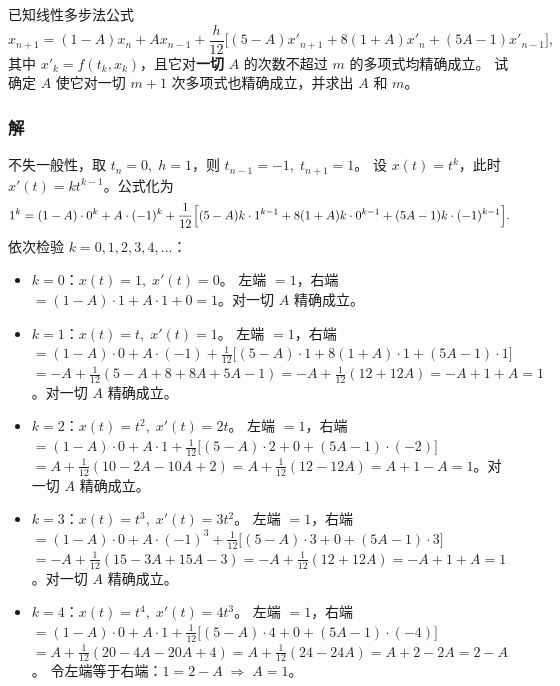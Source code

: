 \documentclass{article}
\begin{document}
已知线性多步法公式
\[
x_{n+1} = (1 - A)x_n + A x_{n-1} 
+ \frac{h}{12}\bigl[(5 - A)x'_{n+1} + 8(1 + A)x'_n + (5A - 1)x'_{n-1}\bigr],
\]
其中 $x'_k = f(t_k, x_k)$，且它对\textbf{一切} $A$ 的次数不超过 $m$ 的多项式均精确成立。
试确定 $A$ 使它对一切 $m+1$ 次多项式也精确成立，并求出 $A$ 和 $m$。

\subsubsection*{解}
不失一般性，取 $t_n = 0, \; h = 1$，则 $t_{n-1} = -1,\; t_{n+1} = 1$。
设 $x(t) = t^k$，此时 $x'(t) = k t^{k-1}$。公式化为
\[
1^k = (1 - A) \cdot 0^k + A \cdot (-1)^k 
+ \frac{1}{12}\Bigl[ (5 - A) k \cdot 1^{k-1} + 8(1 + A) k \cdot 0^{k-1} 
+ (5A - 1) k \cdot (-1)^{k-1} \Bigr].
\]
依次检验 $k = 0,1,2,3,4,\dots$：

\begin{itemize}
\item $k = 0$：$x(t) = 1,\; x'(t) = 0$。
左端 $= 1$，右端 $= (1 - A) \cdot 1 + A \cdot 1 + 0 = 1$。\quad 对一切 $A$ 精确成立。

\item $k = 1$：$x(t) = t,\; x'(t) = 1$。
左端 $= 1$，右端 $= (1 - A) \cdot 0 + A \cdot (-1) + \frac{1}{12}\bigl[(5 - A) \cdot 1 + 8(1 + A) \cdot 1 + (5A - 1) \cdot 1\bigr]$ \\
$= -A + \frac{1}{12}(5 - A + 8 + 8A + 5A - 1) = -A + \frac{1}{12}(12 + 12A) = -A + 1 + A = 1$。\quad 对一切 $A$ 精确成立。

\item $k = 2$：$x(t) = t^2,\; x'(t) = 2t$。
左端 $= 1$，右端 $= (1 - A) \cdot 0 + A \cdot 1 + \frac{1}{12}\bigl[(5 - A) \cdot 2 + 0 + (5A - 1) \cdot (-2)\bigr]$ \\
$= A + \frac{1}{12}(10 - 2A - 10A + 2) = A + \frac{1}{12}(12 - 12A) = A + 1 - A = 1$。\quad 对一切 $A$ 精确成立。

\item $k = 3$：$x(t) = t^3,\; x'(t) = 3t^2$。
左端 $= 1$，右端 $= (1 - A) \cdot 0 + A \cdot (-1)^3 + \frac{1}{12}\bigl[(5 - A) \cdot 3 + 0 + (5A - 1) \cdot 3\bigr]$ \\
$= -A + \frac{1}{12}(15 - 3A + 15A - 3) = -A + \frac{1}{12}(12 + 12A) = -A + 1 + A = 1$。\quad 对一切 $A$ 精确成立。

\item $k = 4$：$x(t) = t^4,\; x'(t) = 4t^3$。
左端 $= 1$，右端 $= (1 - A) \cdot 0 + A \cdot 1 + \frac{1}{12}\bigl[(5 - A) \cdot 4 + 0 + (5A - 1) \cdot (-4)\bigr]$ \\
$= A + \frac{1}{12}(20 - 4A - 20A + 4) = A + \frac{1}{12}(24 - 24A) = A + 2 - 2A = 2 - A$。
令左端等于右端：$1 = 2 - A \;\Longrightarrow\; A = 1$。
\end{itemize}
\end{document}
